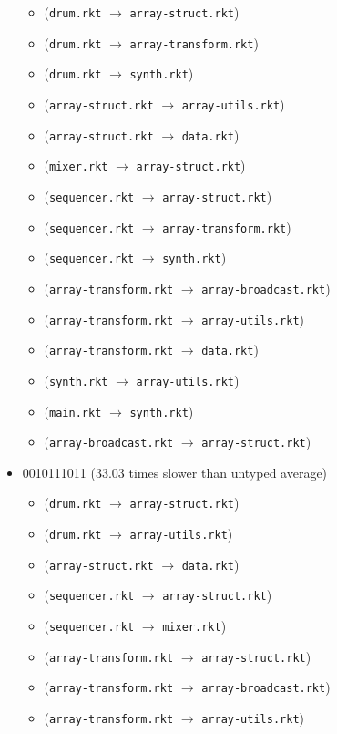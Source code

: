\documentclass{article}
\newcommand{\mono}[1]{\texttt{#1}}
\begin{document}
\begin{itemize}
\begin{itemize}
  \item (\mono{drum.rkt} $\rightarrow$ \mono{array-struct.rkt})
  \item (\mono{drum.rkt} $\rightarrow$ \mono{array-transform.rkt})
  \item (\mono{drum.rkt} $\rightarrow$ \mono{synth.rkt})
  \item (\mono{array-struct.rkt} $\rightarrow$ \mono{array-utils.rkt})
  \item (\mono{array-struct.rkt} $\rightarrow$ \mono{data.rkt})
  \item (\mono{mixer.rkt} $\rightarrow$ \mono{array-struct.rkt})
  \item (\mono{sequencer.rkt} $\rightarrow$ \mono{array-struct.rkt})
  \item (\mono{sequencer.rkt} $\rightarrow$ \mono{array-transform.rkt})
  \item (\mono{sequencer.rkt} $\rightarrow$ \mono{synth.rkt})
  \item (\mono{array-transform.rkt} $\rightarrow$ \mono{array-broadcast.rkt})
  \item (\mono{array-transform.rkt} $\rightarrow$ \mono{array-utils.rkt})
  \item (\mono{array-transform.rkt} $\rightarrow$ \mono{data.rkt})
  \item (\mono{synth.rkt} $\rightarrow$ \mono{array-utils.rkt})
  \item (\mono{main.rkt} $\rightarrow$ \mono{synth.rkt})
  \item (\mono{array-broadcast.rkt} $\rightarrow$ \mono{array-struct.rkt})
  \end{itemize}
\item 0010111011 (33.03 times slower than untyped average)
  \begin{itemize}
  \item (\mono{drum.rkt} $\rightarrow$ \mono{array-struct.rkt})
  \item (\mono{drum.rkt} $\rightarrow$ \mono{array-utils.rkt})
  \item (\mono{array-struct.rkt} $\rightarrow$ \mono{data.rkt})
  \item (\mono{sequencer.rkt} $\rightarrow$ \mono{array-struct.rkt})
  \item (\mono{sequencer.rkt} $\rightarrow$ \mono{mixer.rkt})
  \item (\mono{array-transform.rkt} $\rightarrow$ \mono{array-struct.rkt})
  \item (\mono{array-transform.rkt} $\rightarrow$ \mono{array-broadcast.rkt})
  \item (\mono{array-transform.rkt} $\rightarrow$ \mono{array-utils.rkt})

\end{itemize}
\end{itemize}
\end{document}
